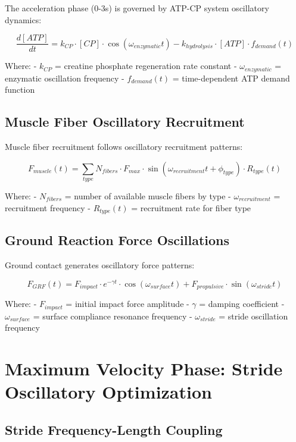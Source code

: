 \documentclass[12pt]{article}
\begin{document}
The acceleration phase (0-3s) is governed by ATP-CP system oscillatory dynamics:

\begin{equation}
\frac{d[ATP]}{dt} = k_{CP} \cdot [CP] \cdot \cos(\omega_{enzymatic}t) - k_{hydrolysis} \cdot [ATP] \cdot f_{demand}(t)
\end{equation}

Where:
- $k_{CP}$ = creatine phosphate regeneration rate constant
- $\omega_{enzymatic}$ = enzymatic oscillation frequency
- $f_{demand}(t)$ = time-dependent ATP demand function

\subsection{Muscle Fiber Oscillatory Recruitment}

Muscle fiber recruitment follows oscillatory recruitment patterns:

\begin{equation}
F_{muscle}(t) = \sum_{type} N_{fibers} \cdot F_{max} \cdot \sin(\omega_{recruitment}t + \phi_{type}) \cdot R_{type}(t)
\end{equation}

Where:
- $N_{fibers}$ = number of available muscle fibers by type
- $\omega_{recruitment}$ = recruitment frequency
- $R_{type}(t)$ = recruitment rate for fiber type

\subsection{Ground Reaction Force Oscillations}

Ground contact generates oscillatory force patterns:

\begin{equation}
F_{GRF}(t) = F_{impact} \cdot e^{-\gamma t} \cdot \cos(\omega_{surface}t) + F_{propulsive} \cdot \sin(\omega_{stride}t)
\end{equation}

Where:
- $F_{impact}$ = initial impact force amplitude
- $\gamma$ = damping coefficient  
- $\omega_{surface}$ = surface compliance resonance frequency
- $\omega_{stride}$ = stride oscillation frequency

\section{Maximum Velocity Phase: Stride Oscillatory Optimization}

\subsection{Stride Frequency-Length Coupling}
\end{document}
